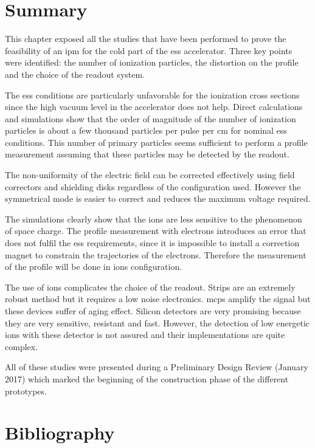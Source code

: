 \begin{refsection}
  \section{Summary}
  \label{ch3:Summary}
  This chapter exposed all the studies that have been performed to prove the feasibility of an \acrshort{ipm} for the cold part of the \acrshort{ess} accelerator. Three key points were identified: the number of ionization particles, the distortion on the profile and the choice of the readout system.

  The \acrshort{ess} conditions are particularly unfavorable for the ionization cross sections since the high vacuum level in the accelerator does not help. Direct calculations and simulations show that the order of magnitude of the number of ionization particles is about a few thousand particles per pulse per cm for nominal \acrshort{ess} conditions. This number of primary particles seems sufficient to perform a profile measurement assuming that these particles may be detected by the readout.

  The non-uniformity of the electric field can be corrected effectively using field correctors and shielding disks regardless of the configuration used. However the symmetrical mode is easier to correct and reduces the maximum voltage required.

  The simulations clearly show that the ions are less sensitive to the phenomenon of space charge. The profile measurement with electrons introduces an error that does not fulfil the \acrshort{ess} requirements, since it is impossible to install a correction magnet to constrain the trajectories of the electrons. Therefore the measurement of the profile will be done in ions configuration.

  The use of ions complicates the choice of the readout. Strips are an extremely robust method but it requires a low noise electronics. \acrshort{mcp}s amplify the signal but these devices suffer of aging effect. Silicon detectors are very promising because they are very sensitive, resistant and fast. However, the detection of low energetic ions with these detector is not assured and their implementations are quite complex.

  All of these studies were presented during a Preliminary Design Review (January 2017) which marked the beginning of the construction phase of the different prototypes.


  \cleardoublepage
  \section*{Bibliography}
  \label{ch3:bib}
  \printbibliography[heading=subbibliography]

\end{refsection}
